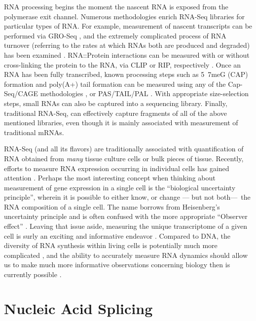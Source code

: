     RNA processing begins the moment the nascent RNA is exposed from the polymerase exit channel. Numerous methodologies enrich RNA-Seq libraries for particular types of RNA. For example, measurement of nascent transcripts can be performed via GRO-Seq \citep{Core2008a}, and the extremely complicated process of RNA turnover (referring to the rates at which RNAs both are produced and degraded) has been examined \citep{Ghosh2010a, Tani2012}. RNA::Protein interactions can be measured with or without cross-linking the protein to the RNA, via CLIP or RIP, respectively \citep{Ule2005,Licatalosi2006,Singh2013}. Once an RNA has been fully transcribed, known processing steps such as 5\textprime~7meG (CAP) formation and poly(A+) tail formation can be measured using any of the Cap-Seq/CAGE methodologies \citep{Shiraki2003a}, or PAS/TAIL/PAL \citep{Shepard2011, Chang2014b, Subtelny2014}. With appropriate size-selection steps, small RNAs \citep{Ghildiyal2008} can also be captured into a sequencing library. Finally, traditional RNA-Seq, can effectively capture fragments of all of the above mentioned libraries, even though it is mainly associated with measurement of traditional mRNAs.

    RNA-Seq (and all its flavors) are traditionally associated with quantification of RNA obtained from \textit{many} tissue culture cells or bulk pieces of tissue. Recently, efforts to measure RNA expression occurring in individual cells has gained attention \citep{Shapiro2013b}. Perhaps the most interesting concept when thinking about measurement of gene expression in a single cell is the ``biological uncertainty principle'', wherein it is possible to either know, or change --- but not both---~the RNA composition of a single cell. The name borrows from Heisenberg's uncertainty principle \citep{Kennard1927} and is often confused with the more appropriate ``Observer effect'' \citep{Riley2013}. Leaving that issue aside, measuring the unique transcriptome of a given cell is surly an exciting and informative endeavor \citep{Marinov2013, Shalek2013b,Wills2013}. Compared to DNA, the diversity of RNA synthesis within living cells is potentially much more complicated \citep{Shendure2012}, and the ability to accurately measure RNA dynamics should allow us to make much more informative observations concerning biology then is currently possible \citep{Djebali2012}.

\section{Nucleic Acid Splicing}
  \label{Intro:sec:Nucleic Acid Splicing}

